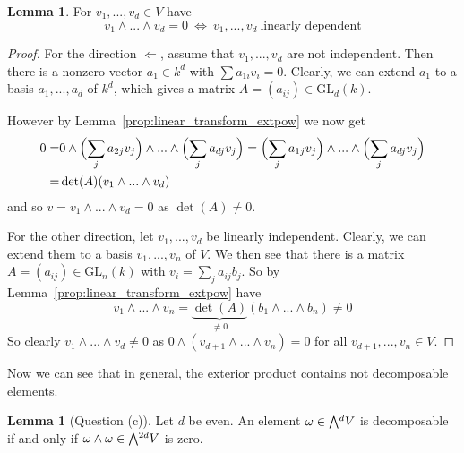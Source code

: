 \documentclass{scrartcl}
\newcommand{\GL}{\mathrm{GL}}
\newcommand{\extpow}{\mathchoice{{\textstyle\bigwedge}}
    {{\bigwedge}}
    {{\textstyle\wedge}}
    {{\scriptstyle\wedge}}}
\theoremstyle{definition}
\newtheorem{lemma}[subsection]{Lemma}
\begin{document}
\begin{lemma}
    \label{prop:extpow_zero_iff_independent}
    For $v_1, ..., v_d \in V$ have
    \begin{equation*}
        v_1 \wedge ... \wedge v_d = 0 \ \Leftrightarrow \ v_1, ..., v_d \ \text{linearly dependent}
    \end{equation*}
\end{lemma}
\begin{proof}
    For the direction $\Leftarrow$, assume that $v_1, ..., v_d$ are not independent. 
    Then there is a nonzero vector $a_1 \in k^d$ with $\sum a_{1i} v_i = 0$.
    Clearly, we can extend $a_1$ to a basis $a_1, ..., a_d$ of $k^d$, which gives a matrix $A = (a_{ij}) \in \GL_d(k)$.

    However by Lemma~\ref{prop:linear_transform_extpow} we now get
    \begin{align*}
        0 =& 0 \wedge \Bigl( \sum_j a_{2j} v_j \Bigr) \wedge ... \wedge \Bigl( \sum_j a_{dj} v_j \Bigr) = \Bigl( \sum_j a_{1j} v_j \Bigr) \wedge ... \wedge \Bigl( \sum_j a_{dj} v_j \Bigr) \\
        =& \det(A) (v_1 \wedge ... \wedge v_d)
    \end{align*}
    and so $v = v_1 \wedge ... \wedge v_d = 0$ as $\det(A) \neq 0$.

    For the other direction, let $v_1, ..., v_d$ be linearly independent.
    Clearly, we can extend them to a basis $v_1, ..., v_n$ of $V$.
    We then see that there is a matrix $A = (a_{ij}) \in \GL_n(k)$ with $v_i = \sum_j a_{ij} b_j$.
    So by Lemma~\ref{prop:linear_transform_extpow} have
    \begin{equation*}
        v_1 \wedge ... \wedge v_n = \underbrace{\det(A)}_{\neq 0} (b_1 \wedge ... \wedge b_n) \neq 0
    \end{equation*}
    So clearly $v_1 \wedge ... \wedge v_d \neq 0$ as $0 \wedge (v_{d + 1} \wedge ... \wedge v_n) = 0$ for all $v_{d + 1}, ..., v_n \in V$.
\end{proof}
Now we can see that in general, the exterior product contains not decomposable elements.
\begin{lemma}[Question (c)]
    \label{prop:characterization_decomposable_d_even}
    Let $d$ be even.
    An element $\omega \in \extpow^d V$ is decomposable if and only if $\omega \wedge \omega \in \extpow^{2d} V$ is zero.
\end{lemma}
\end{document}
